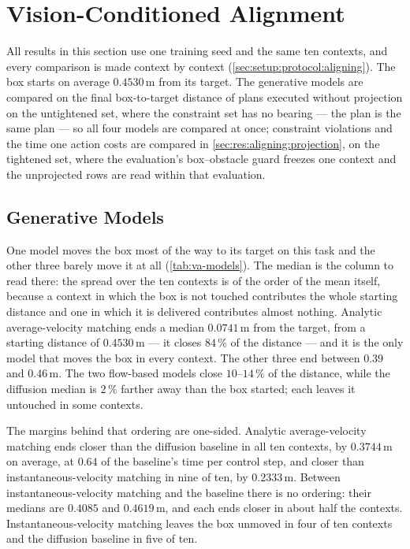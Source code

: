 \section{Vision-Conditioned Alignment}\label{sec:res:visual}

All results in this section use one training seed and the same ten contexts, and every comparison is made
context by context (\autoref{sec:setup:protocol:aligning}). The box starts on average $0.4530$\,m
from its target. The generative models are compared on the final box-to-target distance of plans executed
without projection on the untightened set, where the constraint set has no bearing --- the plan is the
same plan --- so all four models are compared at once; constraint violations and the time one action costs
are compared in \autoref{sec:res:aligning:projection}, on the tightened set, where the evaluation's
box--obstacle guard freezes one context and the unprojected rows are read within that evaluation.

\subsection{Generative Models}\label{sec:res:aligning:models}

One model moves the box most of the way to its target on this task and the other three barely move it at all
(\autoref{tab:va-models}). The median is the column to read there: the spread over the ten contexts is
of the order of the mean itself, because a context in which the box is not touched contributes the whole
starting distance and one in which it is delivered contributes almost nothing. Analytic average-velocity matching ends a median $0.0741$\,m from the target,
from a starting distance of $0.4530$\,m --- it closes $84\,\%$ of the distance --- and it is the only model
that moves the box in every context. The other three end between $0.39$ and $0.46$\,m. The two
flow-based models close $10$--$14\,\%$ of the distance, while the diffusion median is $2\,\%$ farther
away than the box started; each leaves it untouched in some contexts.

The margins behind that ordering are one-sided. Analytic average-velocity matching ends closer than the
diffusion baseline in all ten contexts, by $0.3744$\,m on average, at $0.64$ of the baseline's time per
control step, and closer than instantaneous-velocity matching in nine of ten, by $0.2333$\,m. Between
instantaneous-velocity matching and the baseline there is no ordering: their medians are $0.4085$ and
$0.4619$\,m, and each ends closer in about half the contexts. Instantaneous-velocity matching leaves the
box unmoved in four of ten contexts and the diffusion baseline in five of ten.

